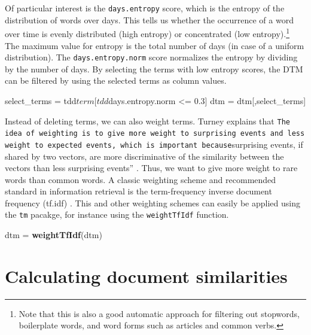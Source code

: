\documentclass[]{article}
\newenvironment{Shaded}{\begin{snugshade}}{\end{snugshade}}
\newcommand{\KeywordTok}[1]{\textcolor[rgb]{0.13,0.29,0.53}{\textbf{{#1}}}}
\newcommand{\FloatTok}[1]{\textcolor[rgb]{0.00,0.00,0.81}{{#1}}}
\newcommand{\StringTok}[1]{\textcolor[rgb]{0.31,0.60,0.02}{{#1}}}
\newcommand{\NormalTok}[1]{{#1}}
\let\rmarkdownfootnote\footnote%
\def\footnote{\protect\rmarkdownfootnote}
\begin{document}
Of particular interest is the \texttt{days.entropy} score, which is the
entropy of the distribution of words over days. This tells us whether
the occurrence of a word over time is evenly distributed (high entropy)
or concentrated (low entropy).\footnote{Note that this is also a good
  automatic approach for filtering out stopwords, boilerplate words, and
  word forms such as articles and common verbs.} The maximum value for
entropy is the total number of days (in case of a uniform distribution).
The \texttt{days.entropy.norm} score normalizes the entropy by dividing
by the number of days. By selecting the terms with low entropy scores,
the DTM can be filtered by using the selected terms as column values.

\begin{Shaded}
\begin{Highlighting}[]
\NormalTok{select_terms =}\StringTok{ }\NormalTok{tdd$term[tdd$days.entropy.norm <=}\StringTok{ }\FloatTok{0.3}\NormalTok{]}
\NormalTok{dtm =}\StringTok{ }\NormalTok{dtm[,select_terms]}
\end{Highlighting}
\end{Shaded}

Instead of deleting terms, we can also weight terms. Turney explains
that
\texttt{The idea of weighting is to give more weight to surprising events and less weight to expected events\textquotesingle{}\textquotesingle{}, which is important because}surprising
events, if shared by two vectors, are more discriminative of the
similarity between the vectors than less surprising events''
\citep[156]{turney02}. Thus, we want to give more weight to rare words
than common words. A classic weighting scheme and recommended standard
in information retrieval is the term-frequency inverse document
frequency (tf.idf) \citep[\citet{monroe08}]{sparck72}. This and other
weighting schemes can easily be applied using the \texttt{tm} pacakge,
for instance using the \texttt{weightTfIdf} function.

\begin{Shaded}
\begin{Highlighting}[]
\NormalTok{dtm =}\StringTok{ }\KeywordTok{weightTfIdf}\NormalTok{(dtm)}
\end{Highlighting}
\end{Shaded}

\section{Calculating document
similarities}\label{calculating-document-similarities}
\end{document}
